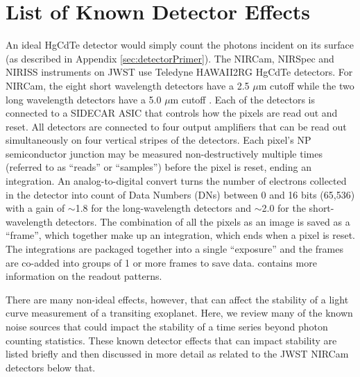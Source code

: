 \documentclass[]{aastex62}
\begin{document}
\section{List of Known Detector Effects}\label{sec:knownEffects}
An ideal HgCdTe detector would simply count the photons incident on its surface (as described in Appendix \ref{sec:detectorPrimer}).
The NIRCam, NIRSpec and NIRISS instruments on JWST use Teledyne HAWAII2RG HgCdTe detectors.
For NIRCam, the eight short wavelength detectors have a 2.5 $\mu$m cutoff while the two long wavelength detectors have a 5.0 $\mu$m cutoff \citep{jdoxNIRCamDetectors}.
Each of the detectors is connected to a SIDECAR ASIC \citep{loose2006sidecarAsic} that controls how the pixels are read out and reset.
All detectors are connected to four output amplifiers that can be read out simultaneously on four vertical stripes of the detectors.
Each pixel's NP semiconductor junction may be measured non-destructively multiple times (referred to as ``reads'' or ``samples'') before the pixel is reset, ending an integration.
An analog-to-digital convert turns the number of electrons collected in the detector into count of Data Numbers (DNs) between 0 and 16 bits (65,536) with a gain of $\sim$1.8 for the long-wavelength detectors and $\sim$2.0 for the short-wavelength detectors.
The combination of all the pixels as an image is saved as a ``frame'', which together make up an integration, which ends when a pixel is reset.
The integrations are packaged together into a single ``exposure'' and the frames are co-added into groups of 1 or more frames to save data.
\citet{jdoxNIRCamDetectorPatterns} contains more information on the readout patterns.

There are many non-ideal effects, however, that can affect the stability of a light curve measurement of a transiting exoplanet.
Here, we review many of the known noise sources that could impact the stability of a time series beyond photon counting statistics.
These known detector effects that can impact stability are listed briefly and then discussed in more detail as related to the JWST NIRCam detectors below that.
\end{document}
